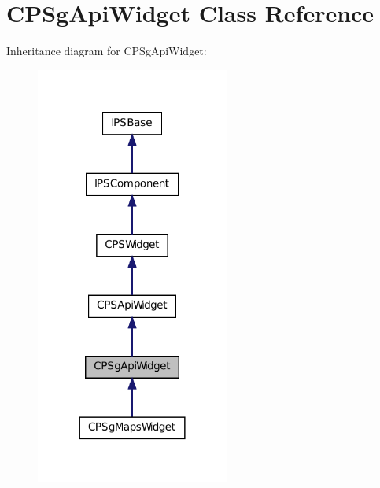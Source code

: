 \hypertarget{classCPSgApiWidget}{
\section{CPSgApiWidget Class Reference}
\label{classCPSgApiWidget}
}


Inheritance diagram for CPSgApiWidget:\nopagebreak
\begin{figure}[H]
\begin{center}
\leavevmode
\includegraphics[width=180pt]{classCPSgApiWidget__inherit__graph}
\end{center}
\end{figure}



